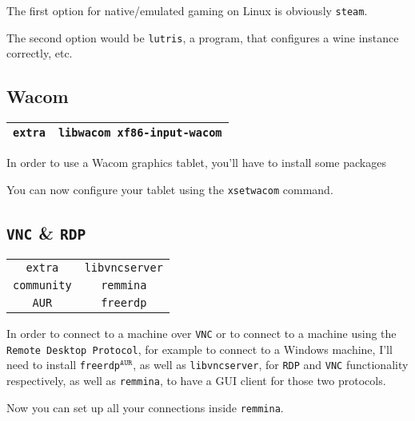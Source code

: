 \documentclass[9pt]{report}
\begin{document}
The first option for native/emulated gaming on Linux is obviously \texttt{steam}.


The second option would be \texttt{lutris}, a program, that configures a wine instance correctly, etc.



\vfill\eject

\hypertarget{x-wacom}{\subsection{Wacom}}
\begin{center}
\begin{tabular}{|c|c|}
\hline
\texttt{extra} & \texttt{libwacom xf86-input-wacom} \\ 
\hline
\end{tabular}
\end{center}

In order to use a Wacom graphics tablet, you’ll have to install some packages


You can now configure your tablet using the \texttt{xsetwacom} command.



\vfill\eject

\hypertarget{x-vnc-and-rdp}{\subsection{\texttt{VNC} \& \texttt{RDP}}}
\begin{center}
\begin{tabular}{|c|c|}
\hline
\texttt{extra} & \texttt{libvncserver} \\ 
\texttt{community} & \texttt{remmina} \\ 
\texttt{AUR} & \texttt{freerdp} \\ 
\hline
\end{tabular}
\end{center}

In order to connect to a machine over \texttt{VNC} or to connect to a machine using the \texttt{Remote Desktop Protocol}, for example to connect to a Windows machine, I’ll need to install \texttt{freerdp}${}^{\texttt{AUR}}$, as well as \texttt{libvncserver}, for \texttt{RDP} and \texttt{VNC} functionality respectively, as well as \texttt{remmina}, to have a GUI client for those two protocols.


Now you can set up all your connections inside \texttt{remmina}.
\end{document}
